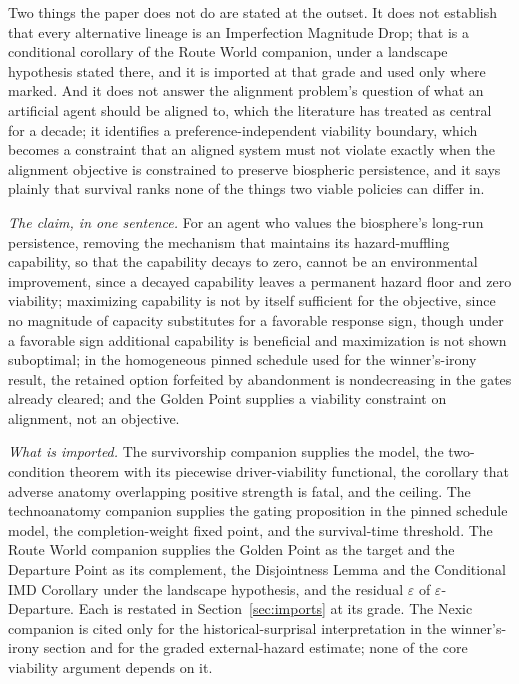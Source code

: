Two things the paper does not do are stated at the outset. It does not
establish that every alternative lineage is an Imperfection Magnitude
Drop; that is a conditional corollary of the Route World companion,
under a landscape hypothesis stated there, and it is imported at that
grade and used only where marked. And it does not answer the alignment
problem's question of what an artificial agent should be aligned to,
which the literature has treated as central for a decade; it identifies a
preference-independent viability boundary, which becomes a constraint
that an aligned system must not violate exactly when the alignment
objective is constrained to preserve biospheric persistence, and it
says plainly that survival ranks none of the things two viable policies
can differ in.

\emph{The claim, in one sentence.} For an agent who values the
biosphere's long-run persistence, removing the mechanism that
maintains its hazard-muffling capability, so that the capability decays
to zero, cannot be an environmental improvement, since a decayed
capability leaves a permanent hazard floor and zero viability;
maximizing capability is not by itself sufficient for the objective, since no magnitude of capacity substitutes for a favorable response sign, though under a favorable sign additional capability is beneficial and maximization is not shown suboptimal; in the
homogeneous pinned schedule used for the winner's-irony result, the
retained option forfeited by abandonment is nondecreasing in the gates
already cleared; and the Golden Point supplies a viability constraint on
alignment, not an objective.

\emph{What is imported.} The survivorship companion \cite{GoldenSurvivorship}
supplies the model, the two-condition theorem with its piecewise
driver-viability functional, the corollary that adverse anatomy
overlapping positive strength is fatal, and the ceiling. The
technoanatomy companion \cite{GoldenTechnoanatomy} supplies the gating proposition
in the pinned schedule model, the completion-weight fixed point, and the
survival-time threshold. The Route World companion \cite{GoldenRouteWorld}
supplies the Golden Point as the target and the Departure Point as its
complement, the Disjointness Lemma and the Conditional IMD Corollary
under the landscape hypothesis, and the residual $\varepsilon$ of
$\varepsilon$-Departure. Each is restated in Section~\ref{sec:imports}
at its grade. The Nexic companion \cite{Nexus} is cited only for the
historical-surprisal interpretation in the winner's-irony section and
for the graded external-hazard estimate; none of the core viability
argument depends on it.

